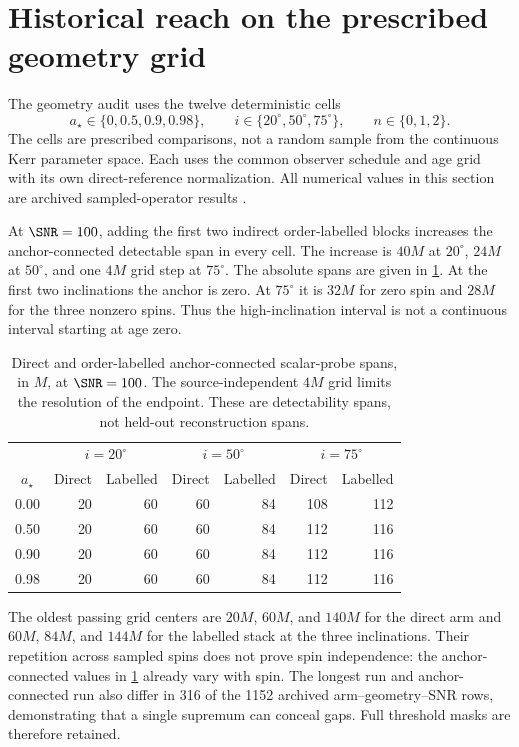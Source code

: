 \section{Historical reach on the prescribed geometry grid}\label{sec:reach}
The geometry audit uses the twelve deterministic cells
\begin{equation}
a_\star\in\{0,0.5,0.9,0.98\},\qquad
 i\in\{20^\circ,50^\circ,75^\circ\},\qquad n\in\{0,1,2\}.
\label{eq:geometrygrid}
\end{equation}
The cells are prescribed comparisons, not a random sample from the continuous Kerr parameter space. Each uses the common observer schedule and age grid with its own direct-reference normalization. All numerical values in this section are archived sampled-operator results \cite{archive}.

At $\SNR=100$, adding the first two indirect order-labelled blocks increases the anchor-connected detectable span in every cell. The increase is $40M$ at $20^\circ$, $24M$ at $50^\circ$, and one $4M$ grid step at $75^\circ$. The absolute spans are given in \cref{tab:reach}. At the first two inclinations the anchor is zero. At $75^\circ$ it is $32M$ for zero spin and $28M$ for the three nonzero spins. Thus the high-inclination interval is not a continuous interval starting at age zero.

\begin{table}[htbp]
\centering\small
\caption{Direct and order-labelled anchor-connected scalar-probe spans, in $M$, at $\SNR=100$. The source-independent $4M$ grid limits the resolution of the endpoint. These are detectability spans, not held-out reconstruction spans.}
\label{tab:reach}
\begin{tabular}{c rr rr rr}
\toprule
&\multicolumn{2}{c}{$i=20^\circ$}&\multicolumn{2}{c}{$i=50^\circ$}&\multicolumn{2}{c}{$i=75^\circ$}\\
$a_\star$&Direct&Labelled&Direct&Labelled&Direct&Labelled\\
\midrule
0.00&20&60&60&84&108&112\\
0.50&20&60&60&84&112&116\\
0.90&20&60&60&84&112&116\\
0.98&20&60&60&84&112&116\\
\bottomrule
\end{tabular}
\end{table}

The oldest passing grid centers are $20M$, $60M$, and $140M$ for the direct arm and $60M$, $84M$, and $144M$ for the labelled stack at the three inclinations. Their repetition across sampled spins does not prove spin independence: the anchor-connected values in \cref{tab:reach} already vary with spin. The longest run and anchor-connected run also differ in 316 of the 1152 archived arm--geometry--SNR rows, demonstrating that a single supremum can conceal gaps. Full threshold masks are therefore retained.

